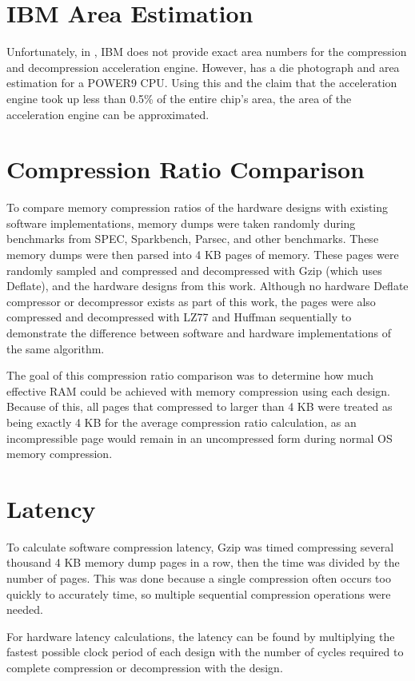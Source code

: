 \documentclass[doublespace,nopageskip]{VTthesis}
\begin{document}
\section{IBM Area Estimation}\label{se:ibm_area_estimation}
Unfortunately, in \cite{ibm}, IBM does not provide exact area numbers for the compression and decompression acceleration engine. However, \cite{wikichip-ibm-area} has a die photograph and area estimation for a POWER9 CPU. Using this and the claim that the acceleration engine took up less than 0.5\% of the entire chip's area, the area of the acceleration engine can be approximated. 

\section{Compression Ratio Comparison}\label{se:compression_ratio_comparison_methodology}
To compare memory compression ratios of the hardware designs with existing software implementations, memory dumps were taken randomly during benchmarks from SPEC, Sparkbench, Parsec, and other benchmarks. These memory dumps were then parsed into 4 KB pages of memory. These pages were randomly sampled and compressed and decompressed with Gzip (which uses Deflate), and the hardware designs from this work. Although no hardware Deflate compressor or decompressor exists as part of this work, the pages were also compressed and decompressed with LZ77 and Huffman sequentially to demonstrate the difference between software and hardware implementations of the same algorithm.

The goal of this compression ratio comparison was to determine how much effective RAM could be achieved with memory compression using each design. Because of this, all pages that compressed to larger than 4 KB were treated as being exactly 4 KB for the average compression ratio calculation, as an incompressible page would remain in an uncompressed form during normal OS memory compression.

\section{Latency}\label{se:latency}
To calculate software compression latency, Gzip was timed compressing several thousand 4 KB memory dump pages in a row, then the time was divided by the number of pages. This was done because a single compression often occurs too quickly to accurately time, so multiple sequential compression operations were needed.

For hardware latency calculations, the latency can be found by multiplying the fastest possible clock period of each design with the number of cycles required to complete compression or decompression with the design. 
\end{document}
